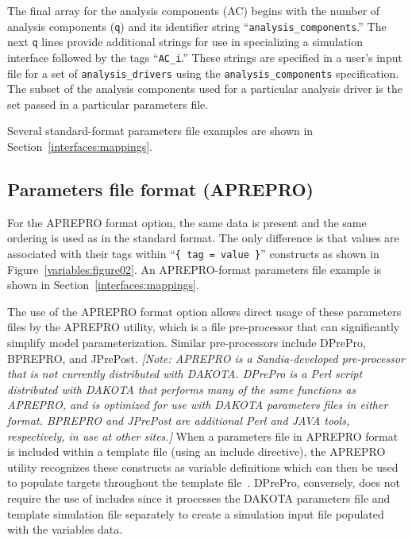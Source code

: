 The final array for the analysis components (AC) begins with the
number of analysis components (\texttt{q}) and its identifier string
``\texttt{analysis\_components}.'' The next \texttt{q} lines provide
additional strings for use in specializing a simulation interface 
followed by the tags ``\texttt{AC\_i}.''  These strings are specified
in a user's input file for a set of \texttt{analysis\_drivers} using 
the \texttt{analysis\_components} specification.  The subset of the
analysis components used for a particular analysis driver is the set
passed in a particular parameters file.

Several standard-format parameters file examples are shown in
Section~\ref{interfaces:mappings}.

\subsection{Parameters file format (APREPRO)}\label{variables:parameters:aprepro}

For the APREPRO format option, the same data is present and the same
ordering is used as in the standard format. The only difference is
that values are associated with their tags within ``\texttt{\{ tag =
value \}}'' constructs as shown in Figure~\ref{variables:figure02}.
An APREPRO-format parameters file example is shown in
Section~\ref{interfaces:mappings}.

The use of the APREPRO format option allows direct usage of these
parameters files by the APREPRO utility, which is a file pre-processor
that can significantly simplify model parameterization.  Similar
pre-processors include DPrePro, BPREPRO, and JPrePost.  \emph{[Note:
APREPRO is a Sandia-developed pre-processor that is not currently
distributed with DAKOTA.  DPrePro is a Perl script distributed with
DAKOTA that performs many of the same functions as APREPRO, and is
optimized for use with DAKOTA parameters files in either format.
BPREPRO and JPrePost are additional Perl and JAVA tools, respectively,
in use at other sites.]}  When a parameters file in APREPRO format is
included within a template file (using an include directive), the
APREPRO utility recognizes these constructs as variable definitions
which can then be used to populate targets throughout the template
file~\cite{Sja92}.  DPrePro, conversely, does not require the use of
includes since it processes the DAKOTA parameters file and template
simulation file separately to create a simulation input file populated
with the variables data.

